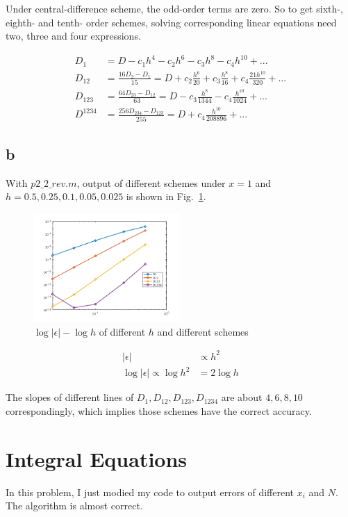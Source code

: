 \documentclass[letterpaper,10pt]{article}
\begin{document}
Under central-difference scheme, the odd-order terms are zero. So to get sixth-, eighth- and tenth- order
schemes, solving corresponding linear equations need two, three and four expressions.

\begin{align*}
  D_1&=D-c_1h^4-c_2h^6-c_3h^8-c_4h^10+...\\
  D_{12}&=\frac{16D_2-D_1}{15}=D+c_2\frac{h^6}{20}+c_3\frac{h^8}{16}+c_4\frac{21h^{10}}{320}+...\\
  D_{123} &=\frac{64D_{23}-D_{12}}{63}=D-c_3\frac{h^8}{1344}-c_4\frac{h^{10}}{1024}+...\\
  D^{1234} &=\frac{256D_{234}-D_{123}}{255}=D+c_4\frac{h^{10}}{208896}+...
\end{align*}
\subsection{b}
With $p2\_2\_{rev}.m$, output of different schemes under $x=1$ and $h=0.5,0.25,0.1,0.05,0.025$ is shown in Fig.~\ref{fig2_1}. 

\begin{figure}[h]
  \centering
  \includegraphics[width=0.5\textwidth]{p2_1.png}
  \caption{$\log |\epsilon|-\log h$ of different $h$ and different schemes}
  \label{fig2_1}
\end{figure}

\begin{align*}
  |\epsilon|&\propto h^2\\
  \log |\epsilon| \propto \log h^2&= 2\log h
\end{align*}

The slopes of different lines of $D_1,D_{12},D_{123},D_{1234}$ are about $4,6,8,10$ correspondingly, 
which implies those schemes have the correct accuracy. 
\section{Integral Equations}
In this problem, I just modied my code to output errors of different $x_i$ and $N$. 
The algorithm is almost correct. 
\end{document}
